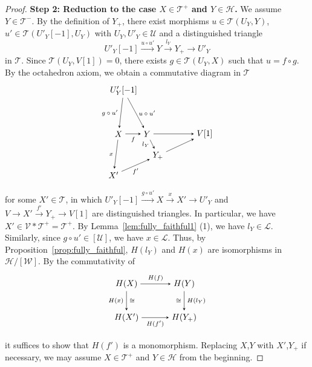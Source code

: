 \documentclass[a4paper,reqno,10pt]{amsart}
\theoremstyle{definition}
\theoremstyle{definition}
\theoremstyle{definition}
\theoremstyle{definition}
\theoremstyle{plain}
\newcommand{\CH}{\mathcal{H}}
\newcommand{\CL}{\mathcal{L}}
\newcommand{\CT}{\mathcal{T}}
\newcommand{\CU}{\mathcal{U}}
\newcommand{\CV}{\mathcal{V}}
\newcommand{\CW}{\mathcal{W}}
\begin{document}
\begin{proof}
\textbf{Step 2: Reduction to the case $X\in\CT^+$ and $Y\in\CH$.}
We assume $Y\in\CT^-$. By the definition of $Y_+$, there exist morphisms $u\in\CT(U_Y,Y)$, $u'\in\CT(U'_Y[-1],U_Y)$ with $U_Y,U'_Y\in\CU$ and a distinguished triangle
\[
U'_Y[-1]\xrightarrow{u\circ u'}Y\xrightarrow{l_Y}Y_+\to U'_Y
\]
in $\CT$.
Since $\CT(U_Y,V[1])=0$, there exists $g\in\CT(U_Y,X)$ such that $u=f\circ g$. By the octahedron axiom, we obtain a commutative diagram in $\CT$
\[
\begin{tikzpicture}[>=stealth]
\node (1) at (-0.98,1.8) {$U'_Y[-1]$};
\node (2) at (-1.19,0) {$X$};
\node (3) at (-1.4,-1.7) {$X'$};
\node (4) at (0,0) {$Y$};
\node (5) at (0.45,-0.9) {$Y_+$};
\node (6) at (2.4,0) {$V[1]$};
\draw[->] (1) -- node[left,font=\scriptsize] {$g\circ u'$} (2);
\draw[->] (1) -- node[right,font=\scriptsize] {$u\circ u'$} (4);
\draw[->] (2) -- node[left,font=\scriptsize] {$x$} (3);
\draw[->] (2) -- node[below,font=\scriptsize] {$f$} (4);
\draw[->] (3) -- node[below,font=\scriptsize] {$f'$} (5);
\draw[->] (4) -- node[left,font=\scriptsize] {$l_Y$} (5);
\draw[->] (4) -- node[above,font=\scriptsize] {} (6);
\draw[->] (5) -- node[below,font=\scriptsize] {} (6);
\end{tikzpicture}
\]
for some $X'\in\CT$, in which 
$U'_Y[-1]\xrightarrow{g\circ u'}X\xrightarrow{x} X'\to U'_Y$
and
$V\to X'\xrightarrow{f'}Y_+\to V[1]$
are distinguished triangles. In particular, we have $X'\in\CV\ast\CT^+=\CT^+$.
By Lemma~\ref{lem:fully_faithful1} {\rm (1)}, we have $l_Y\in\CL$. Similarly, since $g\circ u'\in[\CU]$, we have $x\in\CL$.
Thus, by Proposition~\ref{prop:fully_faithful}, $H(l_Y)$ and $H(x)$ are isomorphisms in $\CH/[\CW]$.
By the commutativity of 
\[
\begin{tikzpicture}[>=stealth]
\node (1) at (-1.2,0.7) {$H(X)$};
\node (2) at (1.2,0.7) {$H(Y)$};
\node (3) at (-1.2,-0.7) {$H(X')$};
\node (4) at (1.2,-0.7) {$H(Y_+)$};
\draw[->] (1) -- node[above,font=\scriptsize] {$H(f)$} (2);
\draw[->] (1) -- node[left,font=\scriptsize] {$H(x)$}
node[right,font=\scriptsize] {$\cong$}(3);
\draw[->] (2) -- node[left,font=\scriptsize] {$\cong$}
node[right,font=\scriptsize] {$H(l_Y)$}(4);
\draw[->] (3) -- node[below,font=\scriptsize] {$H(f')$} (4);
\end{tikzpicture}
\]
it suffices to show that $H(f')$ is a monomorphism. Replacing $X$,$Y$ with $X'$,$Y_+$ if necessary, we may assume $X\in\CT^+$ and $Y\in\CH$ from the beginning.


\end{proof}
\end{document}
